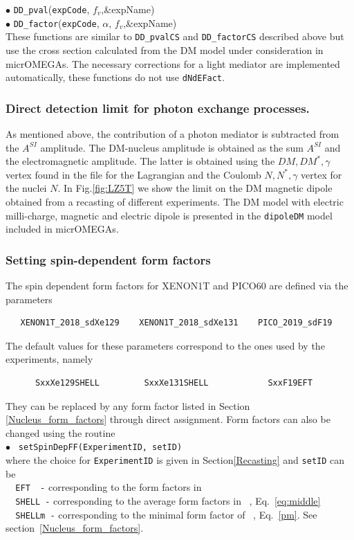 \documentclass[12pt,a4paper]{article}
\begin{document}
\noindent
$\bullet$ \verb|DD_pval|(\verb|expCode|, $f_v$,\&expName)\\
$\bullet$  \verb|DD_factor|(\verb|expCode|, $\alpha$, $f_v$,\&expName)\\     
These functions are similar to  \verb|DD_pvalCS| and \verb|DD_factorCS| described above but use the  cross section calculated from the DM model under consideration in 
micrOMEGAs.  The necessary corrections for a light mediator are implemented automatically, these functions do not use {\tt dNdEFact}. \\


\subsubsection{ Direct detection limit for photon exchange processes.}
As mentioned above, the contribution of a  photon mediator  is subtracted from  the $A^{SI}$ amplitude. The DM-nucleus amplitude is obtained  as the sum 
$A^{SI}$ and the electromagnetic amplitude. The latter is obtained using the   $DM,DM^*,\gamma$ vertex found in the file for the  Lagrangian  and the Coulomb $N,N^*,\gamma$
vertex for the  nuclei $N$. In Fig.\ref{fig:LZ5T} we show the limit on the  DM magnetic dipole obtained from a recasting of different experiments. The DM model with electric 
milli-charge, magnetic and electric dipole is presented in the {\tt dipoleDM} model included in micrOMEGAs.    


\subsubsection{Setting spin-dependent form factors}  
\label{SDmin}

The spin dependent form factors for XENON1T and PICO60  are defined via the parameters 
\begin{verbatim}
   XENON1T_2018_sdXe129    XENON1T_2018_sdXe131    PICO_2019_sdF19
\end{verbatim}
The default values for these parameters correspond to the ones used by the experiments, namely   
\begin{verbatim}
      SxxXe129SHELL         SxxXe131SHELL            SxxF19EFT  
\end{verbatim}
They can be replaced by any form factor listed  in Section \ref{Nucleus_form_factors} through direct
assignment. Form factors can also be changed using the routine  \\
\noindent
$\bullet$ \verb| setSpinDepFF(ExperimentID, setID)|\\
where the choice for \verb|ExperimentID| is given in Section\ref{Recasting} 
and \verb|setID| can be \\
 \verb|  EFT  -|  corresponding to  the form factors in ~\cite{Fitzpatrick:2012ix}\\
  \verb|  SHELL -|  corresponding to  the average form factors in ~\cite{Klos:2013rwa}, Eq.~\ref{eq:middle}\\
  \verb|  SHELLm -|  corresponding to the  minimal form factor of  ~\cite{Klos:2013rwa}, Eq.~\ref{pm}.  See section~\ref{Nucleus_form_factors}.
\end{document}
